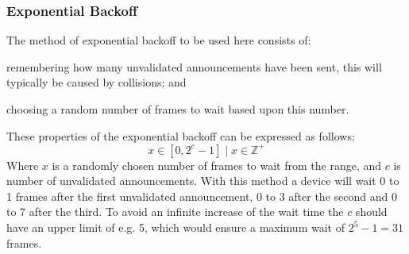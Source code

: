 \subsubsection{Exponential Backoff} %
\label{ssub:exponential_backoff}
The method of exponential backoff to be used here consists of:
\begin{enumerate*}[label=\itshape \alph*\upshape)]
    \item remembering how many unvalidated announcements have been sent, this will typically be caused by collisions; and
    \item choosing a random number of frames to wait based upon this number.   
\end{enumerate*}
These properties of the exponential backoff can be expressed as follows:
\begin{equation}
     x \in [0, 2^c - 1] \mid x \in \mathbb{Z}^+
\end{equation}
Where $x$ is a randomly chosen number of frames to wait from the range, and $c$ is number of unvalidated announcements. With this method a device will wait 0 to 1 frames after the first unvalidated announcement, 0 to 3 after the second and 0 to 7 after the third. To avoid an infinite increase of the wait time the $c$ should have an upper limit of e.g. 5, which would ensure a maximum wait of $2^5-1 = 31$ frames.



